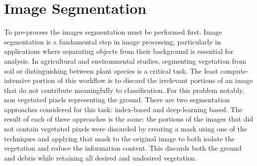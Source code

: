 \documentclass[letterpaper, notitlepage]{report}
\begin{document}
%
%
\section{Image Segmentation}
\label{section:segmentation}
To pre-process the images segmentation must be performed first.  Image segmentation is a fundamental step in image processing, particularly in applications where separating objects from their background is essential for analysis. In agricultural and environmental studies, segmenting vegetation from soil or distinguishing between plant species is a critical task. The least compute-intensive portion of this workflow is to discard the irrelevant portions of an image that do not contribute meaningfully to classification. For this problem notably, non vegetated pixels representing the ground. There are two segmentation approaches considered for this task: index-based and deep-learning based. The result of each of these approaches is the same: the portions of the images that did not contain vegetated pixels were discarded by creating a mask using one of the techniques and applying that mask to the original image to both isolate the vegetation and reduce the information content. This discards both the ground and debris while retaining all desired and undesired vegetation. 
\end{document}
